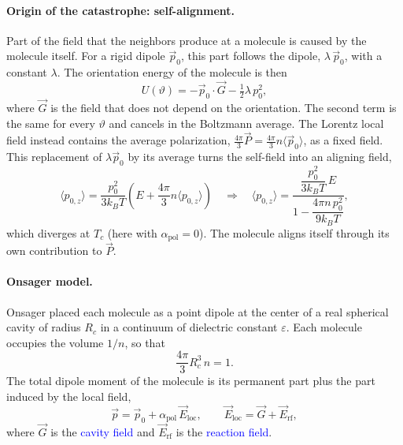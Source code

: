 \paragraph{Origin of the catastrophe: self-alignment.}
Part of the field that the neighbors produce at a molecule is caused by the molecule itself. For a rigid dipole $\vec p_0$, this part follows the dipole, $\lambda\,\vec p_0$, with a constant $\lambda$. The orientation energy of the molecule is then
\begin{equation*}
    U(\vartheta) = -\vec p_0\cdot\vec G - \tfrac12\lambda\,p_0^2,
\end{equation*}
where $\vec G$ is the field that does not depend on the orientation. The second term is the same for every $\vartheta$ and cancels in the Boltzmann average. The Lorentz local field instead contains the average polarization, $\tfrac{4\pi}{3}\vec P = \tfrac{4\pi}{3}n\langle\vec p_0\rangle$, as a fixed field. This replacement of $\lambda\vec p_0$ by its average turns the self-field into an aligning field,
\begin{equation*}
    \langle p_{0,z}\rangle = \frac{p_0^2}{3k_BT}\left(E + \frac{4\pi}{3}n\langle p_{0,z}\rangle\right)
    \quad\Rightarrow\quad
    \langle p_{0,z}\rangle = \frac{\dfrac{p_0^2}{3k_BT}\,E}{1 - \dfrac{4\pi n\,p_0^2}{9k_BT}},
\end{equation*}
which diverges at $T_c$ (here with $\alpha_{\text{pol}} = 0$). The molecule aligns itself through its own contribution to $\vec P$.

\paragraph{Onsager model.}
Onsager placed each molecule as a point dipole at the center of a real spherical cavity of radius $R_c$ in a continuum of dielectric constant $\varepsilon$. Each molecule occupies the volume $1/n$, so that
\begin{equation*}
    \frac{4\pi}{3}R_c^3\,n = 1.
\end{equation*}
The total dipole moment of the molecule is its permanent part plus the part induced by the local field,
\begin{equation*}
    \vec p = \vec p_0 + \alpha_{\text{pol}}\,\vec E_{\text{loc}},
    \qquad
    \vec E_{\text{loc}} = \vec G + \vec E_{\text{rf}},
\end{equation*}
where $\vec G$ is the \textcolor{blue}{cavity field} and $\vec E_{\text{rf}}$ is the \textcolor{blue}{reaction field}.

